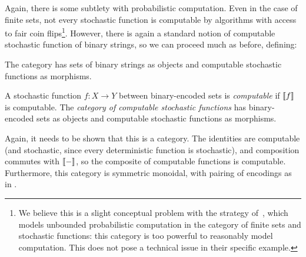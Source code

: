 Again, there is some subtlety with probabilistic computation. Even in the case
of finite sets, not every stochastic function is computable by algorithms with
access to fair coin flips\footnote{
  We believe this is a slight conceptual problem with the strategy
  of~\cite[Section 6]{broadbent-karvonen-2022}, which models unbounded
  probabilistic computation in the category of finite sets and stochastic
  functions: this category is too powerful to reasonably model computation. This
  does not pose a technical issue in their specific example.
}. However, there is again a standard notion of computable stochastic function
of binary strings, so we can proceed much as before, defining:
\begin{dfn}
  The category  has sets of binary strings as objects and
  computable stochastic functions as morphisms.

  A stochastic function $f:X\to Y $ between binary-encoded sets is
  \emph{computable} if $\llbracket f \rrbracket$ is computable. The \emph{category of
  computable stochastic functions}  has binary-encoded sets as
  objects and computable stochastic functions as morphisms.
\end{dfn}

Again, it needs to be shown that this is a category. The identities are
computable (and stochastic, since every deterministic function is stochastic),
and composition commutes with $\llbracket - \rrbracket$, so the composite of computable
functions is computable. Furthermore, this category is symmetric monoidal, with
pairing of encodings as in .

